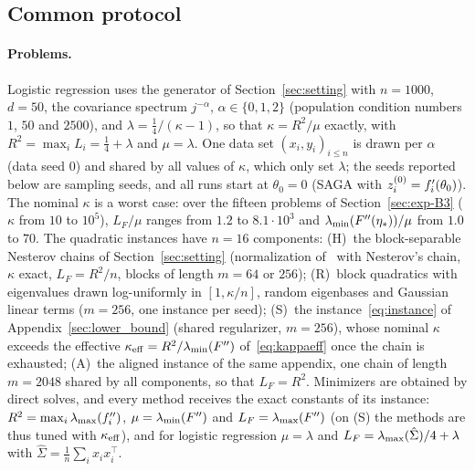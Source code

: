\subsection{Common protocol}\label{sec:exp-protocol}

\paragraph{Problems.}
Logistic regression uses the generator of Section~\ref{sec:setting} with $n=1000$, $d=50$, the covariance spectrum
$j^{-\alpha}$, $\alpha\in\{0,1,2\}$ (population condition numbers $1$, $50$ and $2500$), and $\lambda=\frac14/(\kappa-1)$,
so that $\kappa=R^2/\mu$ exactly, with $R^2=\max_iL_i=\frac14+\lambda$ and $\mu=\lambda$. One data set $(x_i,y_i)_{i\le n}$ is
drawn per $\alpha$ (data seed $0$) and shared by all values of $\kappa$, which only set $\lambda$; the seeds reported below
are sampling seeds, and all runs start at $\theta_0=0$ (SAGA
with $z_i^{(0)}=f'_i(\theta_0)$). The nominal $\kappa$ is a worst case: over the fifteen problems of
Section~\ref{sec:exp-B3} ($\kappa$ from $10$ to $10^5$), $L_F/\mu$ ranges from $1.2$ to $8.1\cdot10^3$ and
$\lambda_{\min}(F''(\eta_\ast))/\mu$ from $1.0$ to $70$. The quadratic instances have $n=16$ components: (H)~the block-separable
Nesterov chains of Section~\ref{sec:setting} (normalization of~\cite{lan2018optimal} with Nesterov's chain, $\kappa$ exact,
$L_F=R^2/n$, blocks of length $m=64$ or $256$); (R)~block quadratics with eigenvalues drawn log-uniformly in $[1,\kappa/n]$, random
eigenbases and Gaussian linear terms ($m=256$, one instance per seed); (S)~the instance~\eqref{eq:instance} of
Appendix~\ref{sec:lower_bound} (shared regularizer, $m=256$), whose nominal $\kappa$ exceeds the effective
$\kappa_{\rm eff}=R^2/\lambda_{\min}(F'')$ of~\eqref{eq:kappaeff} once the chain is exhausted; (A)~the aligned instance of the same
appendix, one chain of length $m=2048$ shared by all components, so that $L_F=R^2$. Minimizers are obtained by direct
solves, and every method receives the exact constants of its instance: $R^2=\max_i\lambda_{\max}(f_i'')$,
$\mu=\lambda_{\min}(F'')$ and $L_F=\lambda_{\max}(F'')$ (on (S) the methods are thus tuned with $\kappa_{\rm eff}$), and for
logistic regression $\mu=\lambda$ and $L_F=\lambda_{\max}(\hat\Sigma)/4+\lambda$ with $\hat\Sigma=\frac1n\sum_ix_ix_i^\top$.

